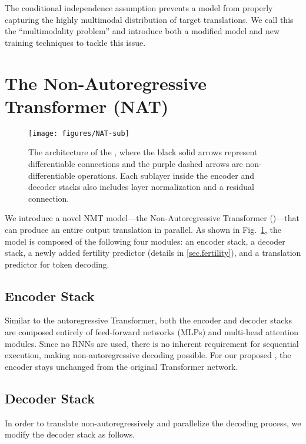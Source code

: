\documentclass{article} \usepackage{iclr2018_conference,times}
\begin{document}
The conditional independence assumption prevents a model from properly capturing the highly multimodal distribution of target translations.
We call this the ``multimodality problem'' and introduce both a modified model and new training techniques to tackle this issue.

\section{The Non-Autoregressive Transformer (NAT)}\label{mainModelSection}

\begin{figure}
\centering
\texttt{[image: figures/NAT-sub]}
\caption{\label{fig.diagram} The architecture of the \model{}, where the black solid arrows represent differentiable connections and the purple dashed arrows are non-differentiable operations. Each sublayer inside the encoder and decoder stacks also includes layer normalization and a residual connection.}
\vspace{-20pt}
\end{figure}

We introduce a novel NMT model---the Non-Autoregressive Transformer (\model)---that can produce an entire output translation in parallel.
As shown in Fig.~\ref{fig.diagram}, the model is composed of the following four modules: 
an encoder stack, 
a decoder stack, 
a newly added fertility predictor (details in \ref{sec.fertility}), and a translation predictor for token decoding. 


\subsection{Encoder Stack}
Similar to the autoregressive Transformer, both the encoder and decoder stacks are composed entirely of feed-forward networks (MLPs) and multi-head attention modules. Since no RNNs are used, there is no inherent requirement for sequential execution, making non-autoregressive decoding possible.
For our proposed \model{}, the encoder stays unchanged from the original Transformer network.

\subsection{Decoder Stack}\label{sec:decoderStack}
In order to translate non-autoregressively and parallelize the decoding process, we modify the decoder stack as follows.

\vspace{-5pt}
\end{document}
